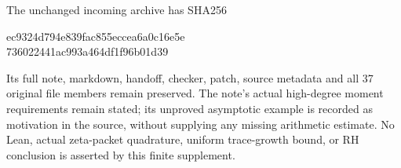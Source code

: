 The unchanged incoming archive has SHA256
\begin{center}\small\ttfamily
ec9324d794e839fac855eccea6a0c16e5e\\
736022441ac993a464df1f96b01d39
\end{center}
Its full note, markdown, handoff, checker, patch, source metadata and all
37 original file members remain preserved. The note's actual high-degree
moment requirements remain stated; its unproved asymptotic example is recorded
as motivation in the source, without supplying any missing arithmetic estimate.
No Lean, actual zeta-packet quadrature, uniform trace-growth bound, or RH
conclusion is asserted by this finite supplement.

\endgroup
